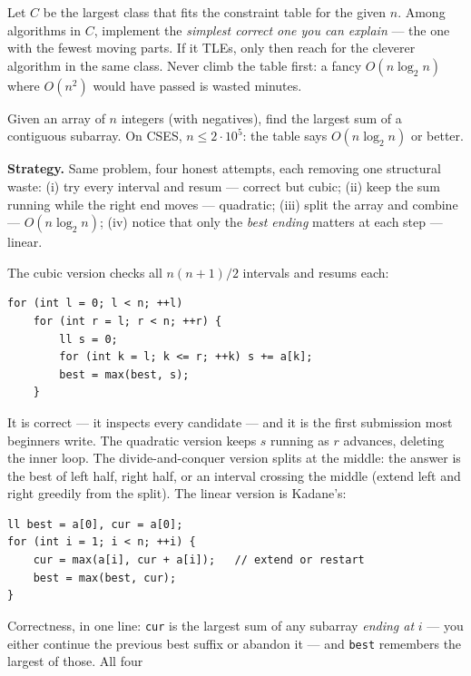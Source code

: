 \begin{rulebox}
Let $C$ be the largest class that fits the constraint table for the given
$n$. Among algorithms in $C$, implement the \emph{simplest correct one you
can explain} --- the one with the fewest moving parts. If it TLEs, only then
reach for the cleverer algorithm in the same class. Never climb the table
first: a fancy $O(n\log_2 n)$ where $O(n^2)$ would have passed is wasted
minutes.
\end{rulebox}

\begin{example}
\label{ex:mss}
Given an array of $n$ integers (with negatives), find the largest sum of a
contiguous subarray. On CSES, $n \le 2\cdot10^5$: the table says
$O(n\log_2 n)$ or better.
\par\smallskip
\textbf{Strategy.} Same problem, four honest attempts, each removing one
structural waste: (i) try every interval and resum --- correct but cubic;
(ii) keep the sum running while the right end moves --- quadratic;
(iii) split the array and combine --- $O(n\log_2 n)$;
(iv) notice that only the \emph{best ending} matters at each step ---
linear.
\par\smallskip
\begin{solution}
The cubic version checks all $n(n+1)/2$ intervals and resums each:
\begin{lstlisting}
for (int l = 0; l < n; ++l)
    for (int r = l; r < n; ++r) {
        ll s = 0;
        for (int k = l; k <= r; ++k) s += a[k];
        best = max(best, s);
    }
\end{lstlisting}
It is correct --- it inspects every candidate --- and it is the first
submission most beginners write. The quadratic version keeps $s$ running as
$r$ advances, deleting the inner loop. The divide-and-conquer version splits
at the middle: the answer is the best of left half, right half, or an
interval crossing the middle (extend left and right greedily from the
split). The linear version is Kadane's:
\begin{lstlisting}
ll best = a[0], cur = a[0];
for (int i = 1; i < n; ++i) {
    cur = max(a[i], cur + a[i]);   // extend or restart
    best = max(best, cur);
}
\end{lstlisting}
Correctness, in one line: \texttt{cur} is the largest sum of any subarray
\emph{ending at} $i$ --- you either continue the previous best suffix or
abandon it --- and \texttt{best} remembers the largest of those. All four

\end{solution}
\end{example}
